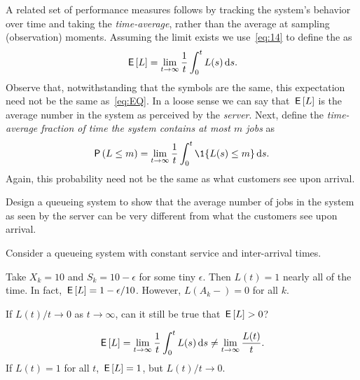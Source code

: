 A related set of performance measures follows by tracking the system's behavior over time and taking the \emph{time-average}, rather than the average at sampling (observation) moments.
Assuming the limit exists we use~\cref{eq:14} to define the  as
\begin{equation}
 \label{eq:46}
 \,\mathsf{E}\left[L\right] = \lim_{t\to\infty} \frac 1 t\int_0^t L(s) \,\text{d}s.
\end{equation}
Observe that, notwithstanding that the symbols are the same, this expectation need not be the same as~\cref{eq:EQ}.
In a loose sense we can say that $\,\mathsf{E}\left[L\right]$ is the average number in the system as perceived by the \emph{server}.
Next, define the \emph{time-average fraction of time the system contains at most $m$ jobs} as
\begin{equation}
 \label{eq:47}
 \P{L\leq m} =\lim_{t\to\infty} \frac 1 t\int_0^t \1{L(s)\leq m} \d s.
\end{equation}
Again, this probability need not be the same as what customers see upon arrival.


\begin{exercise}
Design a queueing system to show that the average number of jobs in the system as seen by the server can be very different from what the customers see upon arrival.
\begin{hint}
Consider a queueing system with constant service and inter-arrival times.
\end{hint}
\begin{solution}
 Take $X_k = 10$ and $S_k = 10-\epsilon$ for some tiny
 $\epsilon$. Then $L(t) = 1$ nearly all of the time. In fact,
 $\,\mathsf{E}\left[L\right] = 1-\epsilon/10$. However, $L(A_k-)=0$ for all $k$.
\end{solution}
\end{exercise}


\begin{extra}
 If $L(t)/t \to 0$ as $t\to\infty$, can it still be true that $\,\mathsf{E}\left[L\right]>0$? 
\begin{solution}
 \begin{equation*}
 \,\mathsf{E}\left[L\right] = \lim_{t\to\infty} \frac 1 t \int_0^t L(s) \,\text{d}s \neq \lim_{t\to\infty} \frac{L(t)}t.
 \end{equation*}
If $L(t)=1$ for all $t$, $\,\mathsf{E}\left[L\right] =1 $, but $L(t)/t \to 0$. 
\end{solution}
\end{extra}


